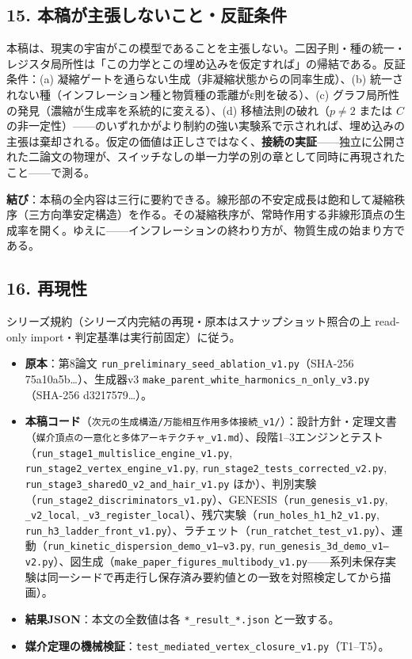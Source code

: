 \documentclass[
  a4paper,
]{ltjsarticle}
\providecommand{\tightlist}{%
  \setlength{\itemsep}{0pt}\setlength{\parskip}{0pt}}
\begin{document}
\subsection{15.
本稿が主張しないこと・反証条件}\label{ux672cux7a3fux304cux4e3bux5f35ux3057ux306aux3044ux3053ux3068ux53cdux8a3cux6761ux4ef6}

本稿は、現実の宇宙がこの模型であることを主張しない。二因子則・種の統一・レジスタ局所性は「この力学とこの埋め込みを仮定すれば」の帰結である。反証条件：(a)
凝縮ゲートを通らない生成（非凝縮状態からの同率生成）、(b)
統一されない種（インフレーション種と物質種の乖離がε則を破る）、(c)
グラフ局所性の発見（濃縮が生成率を系統的に変える）、(d)
移植法則の破れ（\(p\neq2\) または \(C\)
の非一定性）------のいずれかがより制約の強い実験系で示されれば、埋め込みの主張は棄却される。仮定の価値は正しさではなく、\textbf{接続の実証}------独立に公開された二論文の物理が、スイッチなしの単一力学の別の章として同時に再現されたこと------で測る。

\textbf{結び}：本稿の全内容は三行に要約できる。線形部の不安定成長は飽和して凝縮秩序（三方向準安定構造）を作る。その凝縮秩序が、常時作用する非線形頂点の生成率を開く。ゆえに------インフレーションの終わり方が、物質生成の始まり方である。

\subsection{16. 再現性}\label{ux518dux73feux6027}

シリーズ規約（シリーズ内完結の再現・原本はスナップショット照合の上
read-only import・判定基準は実行前固定）に従う。

\begin{itemize}
\tightlist
\item
  \textbf{原本}：第8論文
  \texttt{run\_preliminary\_seed\_ablation\_v1.py}（SHA-256
  75a10a5b\ldots）、生成器v3
  \texttt{make\_parent\_white\_harmonics\_n\_only\_v3.py}（SHA-256
  d3217579\ldots）。
\item
  \textbf{本稿コード}（\texttt{次元の生成構造/万能相互作用多体接続\_v1/}）：設計方針・定理文書（\texttt{媒介頂点の一意化と多体アーキテクチャ\_v1.md}）、段階1--3エンジンとテスト（\texttt{run\_stage1\_multislice\_engine\_v1.py},
  \texttt{run\_stage2\_vertex\_engine\_v1.py},
  \texttt{run\_stage2\_tests\_corrected\_v2.py},
  \texttt{run\_stage3\_sharedO\_v2\_and\_hair\_v1.py}
  ほか）、判別実験（\texttt{run\_stage2\_discriminators\_v1.py}）、GENESIS（\texttt{run\_genesis\_v1.py},
  \texttt{\_v2\_local},
  \texttt{\_v3\_register\_local}）、残穴実験（\texttt{run\_holes\_h1\_h2\_v1.py},
  \texttt{run\_h3\_ladder\_front\_v1.py}）、ラチェット（\texttt{run\_ratchet\_test\_v1.py}）、運動（\texttt{run\_kinetic\_dispersion\_demo\_v1–v3.py},
  \texttt{run\_genesis\_3d\_demo\_v1–v2.py}）、図生成（\texttt{make\_paper\_figures\_multibody\_v1.py}------系列未保存実験は同一シードで再走行し保存済み要約値との一致を対照検定してから描画）。
\item
  \textbf{結果JSON}：本文の全数値は各 \texttt{*\_result\_*.json}
  と一致する。
\item
  \textbf{媒介定理の機械検証}：\texttt{test\_mediated\_vertex\_closure\_v1.py}（T1--T5）。
\end{itemize}
\end{document}
